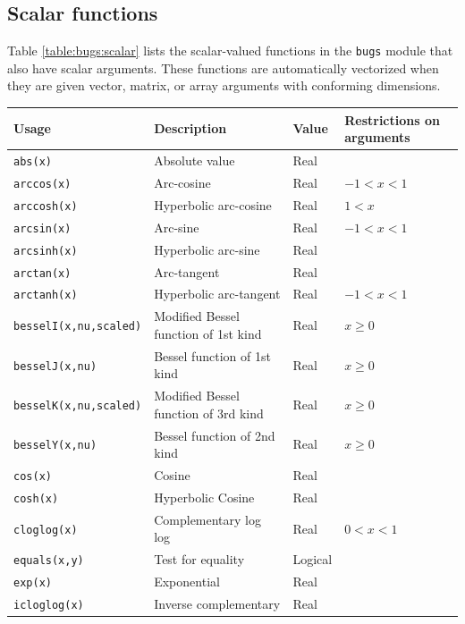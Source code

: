 \documentclass[11pt, a4paper, titlepage]{report}
\begin{document}
\subsection{Scalar functions}

Table \ref{table:bugs:scalar} lists the scalar-valued functions in the
\texttt{bugs} module that also have scalar arguments.  These functions
are automatically vectorized when they are given vector, matrix, or
array arguments with conforming dimensions.


\begin{table}
\begin{center}
\begin{tabular}{llll}
\hline
Usage  & Description & Value & Restrictions on arguments \\ 
\hline
\verb+abs(x)+       & Absolute value        & Real & \\
\verb+arccos(x)+    & Arc-cosine            & Real & $-1 < x < 1$\\
\verb+arccosh(x)+   & Hyperbolic arc-cosine & Real & $1 < x$ \\
\verb+arcsin(x)+    & Arc-sine              & Real & $-1 < x < 1$\\
\verb+arcsinh(x)+   & Hyperbolic arc-sine   & Real &\\
\verb+arctan(x)+    & Arc-tangent           & Real &\\
\verb+arctanh(x)+   & Hyperbolic arc-tangent & Real & $-1 < x < 1$\\
\verb+besselI(x,nu,scaled)+ &Modified Bessel function of 1st kind & Real & $x \geq 0$ \\
\verb+besselJ(x,nu)+ &Bessel function of 1st kind & Real & $x \geq 0$ \\
\verb+besselK(x,nu,scaled)+ &Modified Bessel function of 3rd kind & Real & $x \geq 0$ \\
\verb+besselY(x,nu)+ &Bessel function of 2nd kind & Real & $x \geq 0$ \\
\verb+cos(x)+       & Cosine              & Real & \\
\verb+cosh(x)+      & Hyperbolic Cosine   & Real & \\
\verb+cloglog(x)+    & Complementary log log & Real & $0 < x < 1$ \\
\verb+equals(x,y)+   & Test for equality   & Logical & \\
\verb+exp(x)+       & Exponential         & Real & \\
\verb+icloglog(x)+  & Inverse complementary & Real & \\

\end{tabular}
\end{center}
\end{table}
\end{document}

